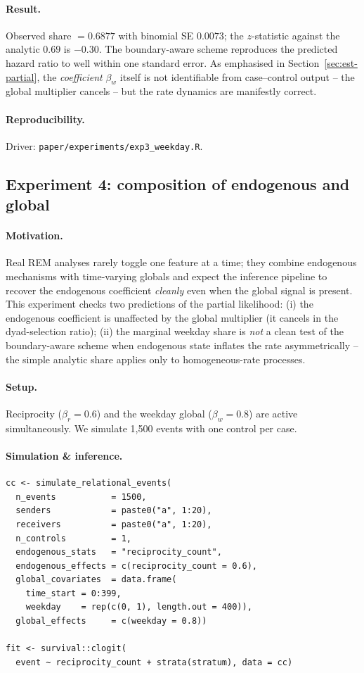 \documentclass[11pt,a4paper]{article}
\begin{document}
\paragraph{Result.}
Observed share $= 0.6877$ with binomial SE $0.0073$; the
$z$-statistic against the analytic $0.69$ is $-0.30$. The
boundary-aware scheme reproduces the predicted hazard ratio to
well within one standard error. As emphasised in
Section~\ref{sec:est-partial}, the \emph{coefficient}
$\beta_w$ itself is not identifiable from case--control output --
the global multiplier cancels -- but the rate dynamics are
manifestly correct.

\paragraph{Reproducibility.}
Driver: \texttt{paper/experiments/exp3\_weekday.R}.

\subsection{Experiment 4: composition of endogenous and global}
\label{sec:exp4}

\paragraph{Motivation.}
Real REM analyses rarely toggle one feature at a time; they
combine endogenous mechanisms with time-varying globals and
expect the inference pipeline to recover the endogenous
coefficient \emph{cleanly} even when the global signal is
present. This experiment checks two predictions of the partial
likelihood: (i) the endogenous coefficient is unaffected by the
global multiplier (it cancels in the dyad-selection ratio); (ii)
the marginal weekday share is \emph{not} a clean test of the
boundary-aware scheme when endogenous state inflates the rate
asymmetrically -- the simple analytic share applies only to
homogeneous-rate processes.

\paragraph{Setup.}
Reciprocity ($\beta_r = 0.6$) and the weekday global
($\beta_w = 0.8$) are active simultaneously. We simulate 1{,}500
events with one control per case.

\paragraph{Simulation \& inference.}
\begin{lstlisting}
cc <- simulate_relational_events(
  n_events           = 1500,
  senders            = paste0("a", 1:20),
  receivers          = paste0("a", 1:20),
  n_controls         = 1,
  endogenous_stats   = "reciprocity_count",
  endogenous_effects = c(reciprocity_count = 0.6),
  global_covariates  = data.frame(
    time_start = 0:399,
    weekday    = rep(c(0, 1), length.out = 400)),
  global_effects     = c(weekday = 0.8))

fit <- survival::clogit(
  event ~ reciprocity_count + strata(stratum), data = cc)
\end{lstlisting}
\end{document}

